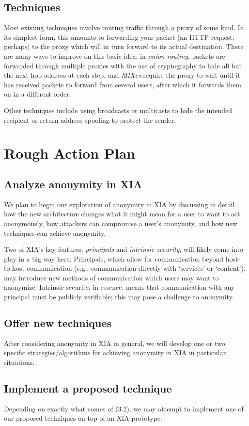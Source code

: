 \documentclass[11pt]{article}
\begin{document}
\subsection{Techniques}
Most existing techniques involve routing traffic through a proxy of some kind. In its simplest form, this amounts to forwarding your packet (an HTTP request, perhaps) to the proxy which will in turn forward to its actual destination. There are many ways to improve on this basic idea; in \emph{onion routing}, packets are forwarded through multiple proxies with the use of cryptography to hide all but the next hop address at each step, and \emph{MIXes} \cite{Chaum81} require the proxy to wait until it has received packets to forward from several users, after which it forwards them on in a different order.

Other techniques include using broadcasts or multicasts to hide the intended recipient or return address spoofing to protect the sender.


\section{Rough Action Plan}

\subsection{Analyze anonymity in XIA}
We plan to begin our exploration of anonymity in XIA by discussing in detail how the new architecture changes what it might mean for a user to want to act anonymously, how attackers can compromise a user's anonymity, and how new techniques can achieve anonymity.

Two of XIA's key features, \emph{principals} and \emph{intrinsic security}, will likely come into play in a big way here. Principals, which allow for communication beyond host-to-host communication (e.g., communication directly with `services' or `content'), may introduce new methods of communication which users may want to anonymize. Intrinsic security, in essence, means that communication with any principal must be publicly verifiable; this may pose a challenge to anonymity.

\subsection{Offer new techniques}
After considering anonymity in XIA in general, we will develop one or two specific strategies/algorithms for achieving anonymity in XIA in particular situations.

\subsection{Implement a proposed technique}
Depending on exactly what comes of (3.2), we may attempt to implement one of our proposed techniques on top of an XIA prototype.


\bigskip

{}
\end{document}
